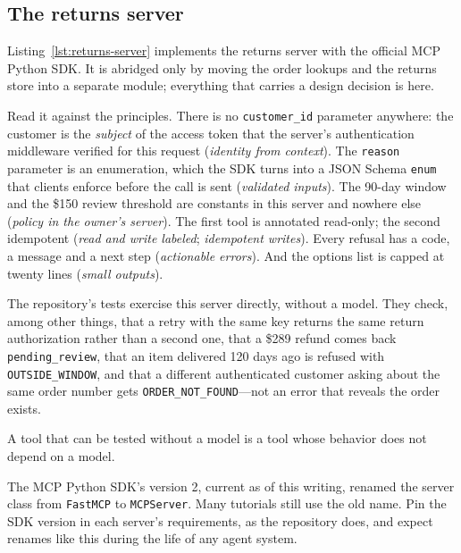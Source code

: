 \subsection{The returns server}

Listing~\ref{lst:returns-server} implements the returns server with the official MCP Python SDK. It is abridged only by moving the order lookups and the returns store into a separate module; everything that carries a design decision is here.



Read it against the principles. There is no \texttt{customer\_id} parameter anywhere: the customer is the \emph{subject} of the access token that the server's authentication middleware verified for this request (\emph{identity from context}). The \texttt{reason} parameter is an enumeration, which the SDK turns into a JSON Schema \texttt{enum} that clients enforce before the call is sent (\emph{validated inputs}). The 90-day window and the \$150 review threshold are constants in this server and nowhere else (\emph{policy in the owner's server}). The first tool is annotated read-only; the second idempotent (\emph{read and write labeled}; \emph{idempotent writes}). Every refusal has a code, a message and a next step (\emph{actionable errors}). And the options list is capped at twenty lines (\emph{small outputs}).

The repository's tests exercise this server directly, without a model. They check, among other things, that a retry with the same key returns the same return authorization rather than a second one, that a \$289 refund comes back \texttt{pending\_review}, that an item delivered 120 days ago is refused with \texttt{OUTSIDE\_WINDOW}, and that a different authenticated customer asking about the same order number gets \texttt{ORDER\_NOT\_FOUND}---not an error that reveals the order exists. \begin{keyidea}
A tool that can be tested without a model is a tool whose behavior does not depend on a model.
\end{keyidea}

\begin{designnote}
The MCP Python SDK's version 2, current as of this writing, renamed the server class from \texttt{FastMCP} to \texttt{MCPServer}. Many tutorials still use the old name. Pin the SDK version in each server's requirements, as the repository does, and expect renames like this during the life of any agent system.
\end{designnote}

